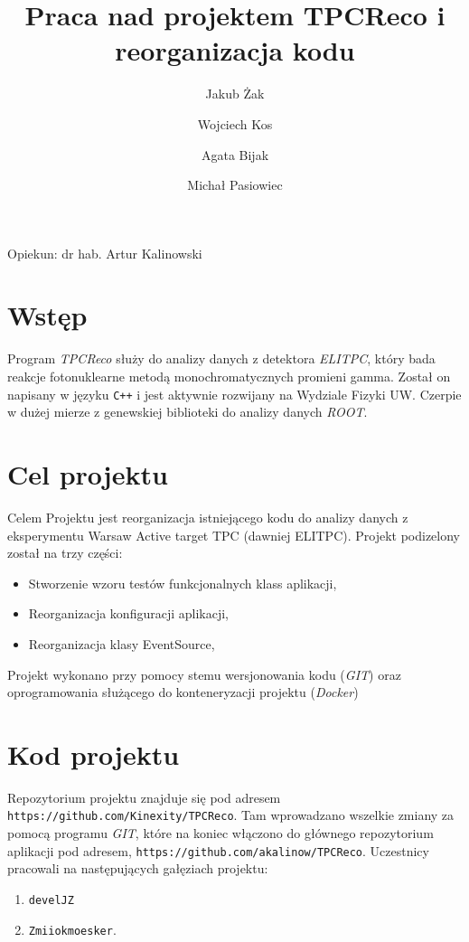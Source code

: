 \documentclass{article}
\title{Praca nad projektem TPCReco i reorganizacja kodu}
\author{Jakub Żak \and Wojciech Kos \and Agata Bijak \and Michał Pasiowiec}
\date{}
\begin{document}
\maketitle
\vfill
\centerline{\large Opiekun: dr hab. Artur Kalinowski}
\vfill

\pagebreak
\section{Wstęp}
Program \textit{TPCReco} służy do analizy danych z detektora \textit{ELITPC}, który bada reakcje fotonuklearne metodą monochromatycznych promieni gamma. Został on napisany w języku \texttt{C++} i jest aktywnie rozwijany na Wydziale Fizyki UW. Czerpie w dużej mierze z genewskiej biblioteki do analizy danych \textit{ROOT}\cite{cern}.

\section{Cel projektu}
Celem Projektu jest reorganizacja istniejącego kodu do analizy danych z eksperymentu Warsaw Active target TPC (dawniej ELITPC).
Projekt podizelony został na trzy części: 


\begin{itemize}
    \item Stworzenie wzoru testów funkcjonalnych klass aplikacji, 
    \item Reorganizacja konfiguracji aplikacji,
    \item Reorganizacja klasy  EventSource,
\end{itemize}
Projekt wykonano przy pomocy stemu wersjonowania kodu (\textit{GIT}\cite{git}) oraz oprogramowania służącego do konteneryzacji projektu (\textit{Docker}\cite{docker})

\vfill
\pagebreak

\section{Kod projektu}
\label{kod}
Repozytorium projektu znajduje się pod adresem \texttt{https://github.com/Kinexity/TPCReco}. Tam wprowadzano wszelkie zmiany za pomocą programu \textit{GIT}, które na koniec włączono do głównego repozytorium aplikacji pod adresem, \texttt{https://github.com/akalinow/TPCReco}. Uczestnicy pracowali na następujących gałęziach projektu:
\begin{enumerate}
    \item \texttt{develJZ}
    \item \texttt{Zmiiokmoesker}.
\end{enumerate}
\end{document}
